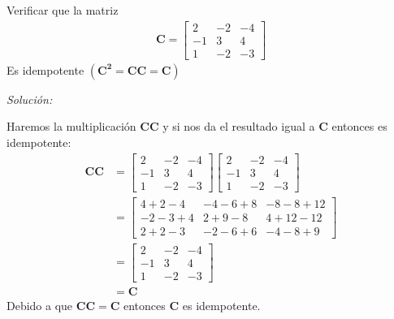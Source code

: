 \documentclass[12pt]{article}
\newenvironment{problem}[2][Problema]{\begin{trivlist}
\item[\hskip \labelsep {\bfseries #1}\hskip \labelsep {\bfseries #2.}]}{\end{trivlist}}
\newenvironment{sol}
    {\emph{Solución:}
    }
    {
    }
\begin{document}
\begin{problem}{5}
Verificar que la matriz
\begin{align*}
\mathbf{C} = 
\begin{bmatrix}
2 & -2 & -4 \\
-1 & 3 & 4 \\
1 & -2 & -3 
\end{bmatrix}
\end{align*}
Es idempotente $(\mathbf{C^2}=\mathbf{CC}=\mathbf{C})$
\end{problem}
\begin{sol}
Haremos la multiplicación $\mathbf{CC}$ y si nos da el resultado igual a $\mathbf{C}$ entonces es idempotente:
\begin{align*}
\mathbf{CC} &= 
\begin{bmatrix}
2 & -2 & -4 \\
-1 & 3 & 4 \\
1 & -2 & -3 
\end{bmatrix}
\begin{bmatrix}
2 & -2 & -4 \\
-1 & 3 & 4 \\
1 & -2 & -3 
\end{bmatrix} \\
&=
\begin{bmatrix}
4 + 2 - 4 & -4 - 6 + 8 & -8 - 8 + 12 \\
-2 - 3 + 4 & 2 + 9 - 8 & 4 + 12 - 12 \\
2 + 2 - 3 & -2 - 6 + 6 & -4 - 8 + 9
\end{bmatrix}\\
&=
\begin{bmatrix}
2 & -2 & -4 \\
-1 & 3 & 4 \\
1 & -2 & -3 
\end{bmatrix}\\
&=
\mathbf{C}
\end{align*}
Debido a que $\mathbf{CC}=\mathbf{C}$ entonces $\mathbf{C}$ es idempotente.
\end{sol}

\pagebreak





\end{document}
